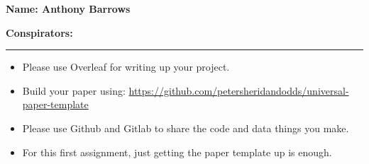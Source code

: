 \textbf{Name: Anthony Barrows} \\

\medskip

\textbf{Conspirators:} 

\medskip
\medskip

\hrule

\medskip


\assignmentsonly{\pleasesubmitprojectdraft}

\begin{itemize}
\item 
  Please use Overleaf for writing up your project.
\item
  Build your paper using:
  \url{https://github.com/petersheridandodds/universal-paper-template}
\item
  Please use Github and Gitlab to share the code and data things you make.
\item
  For this first assignment, just getting the paper template up is enough.
\end{itemize}

\vspace{5mm}



